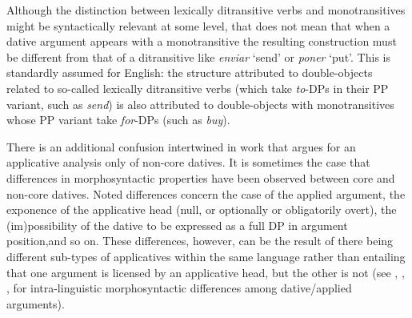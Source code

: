 \documentclass[output=paper,colorlinks,citecolor=brown,nonflat]{./langscibook}
\begin{document}
Although the distinction between lexically ditransitive verbs and monotransitives might be syntactically relevant at some level, that does not mean that when a dative argument appears with a monotransitive the resulting construction must be different from that of a ditransitive like \textit{enviar} ‘send’ or \textit{poner} ‘put’.  This is standardly assumed for English: the structure attributed to double-objects related to so-called lexically ditransitive verbs (which take \textit{to}-DPs in their PP variant, such as \textit{send}) is also attributed to double-objects with monotransitives whose PP variant take \textit{for}-DPs (such as \textit{buy}).

There is an additional confusion intertwined in work that argues for an applicative analysis only of non-core datives. It is sometimes the case that differences in morphosyntactic properties have been observed between core and non-core datives. Noted differences concern the case of the applied argument, the exponence of the applicative head (null, or optionally or obligatorily overt), the (im)possibility of the dative to be expressed as a full DP in argument position,and so on. These differences, however, can be the result of there being different sub-types of applicatives within the same language rather than entailing that one argument is licensed by an applicative head, but the other is not (see \citealt{BonehNash2012, Cuervo2003}, \citeyear{Cuervo2015Syntax}, \citealt{Diaconescu2004, Pineda2016, RobergeTroberg2009}, for intra-linguistic morphosyntactic differences among dative/applied arguments). 
\end{document}
